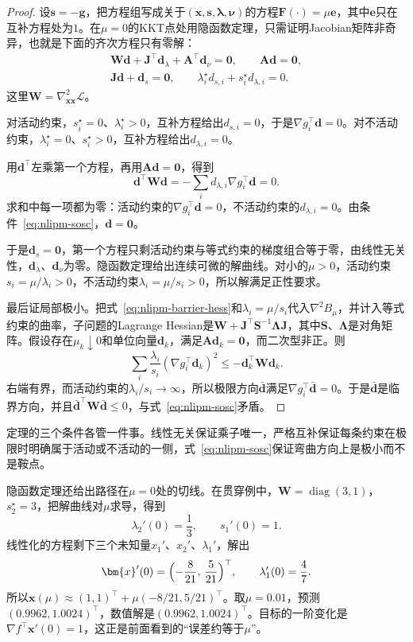 \begin{proof}
设$\bm{s}=-\bm{g}$，把方程组写成关于$(\bm{x},\bm{s},\bm{\lambda},\bm{\nu})$的方程$\bm{F}(\cdot)=\mu\bm{e}$，其中$\bm{e}$只在互补方程处为$1$。在$\mu=0$的KKT点处用隐函数定理，只需证明Jacobian矩阵非奇异，也就是下面的齐次方程只有零解：
\[
 \begin{gathered}
 \bm{W}\bm{d}+\bm{J}^\top\bm{d}_\lambda+\bm{A}^\top\bm{d}_\nu=\bm{0},\qquad\bm{A}\bm{d}=\bm{0},\\
 \bm{J}\bm{d}+\bm{d}_s=\bm{0},\qquad\lambda_i^\star d_{s,i}+s_i^\star d_{\lambda,i}=0.
 \end{gathered}
\]
这里$\bm{W}=\nabla^2_{\bm{x}\bm{x}}\mathcal{L}$。

对活动约束，$s_i^\star=0$、$\lambda_i^\star>0$，互补方程给出$d_{s,i}=0$，于是$\nabla g_i^\top\bm{d}=0$。对不活动约束，$\lambda_i^\star=0$、$s_i^\star>0$，互补方程给出$d_{\lambda,i}=0$。

用$\bm{d}^\top$左乘第一个方程，再用$\bm{A}\bm{d}=\bm{0}$，得到
\[
 \bm{d}^\top\bm{W}\bm{d}=-\sum_{i}d_{\lambda,i}\nabla g_i^\top\bm{d}=0.
\]
求和中每一项都为零：活动约束的$\nabla g_i^\top\bm{d}=0$，不活动约束的$d_{\lambda,i}=0$。由条件~\eqref{eq:nlipm-sosc}，$\bm{d}=\bm{0}$。

于是$\bm{d}_s=\bm{0}$，第一个方程只剩活动约束与等式约束的梯度组合等于零，由线性无关性，$\bm{d}_\lambda$、$\bm{d}_\nu$为零。隐函数定理给出连续可微的解曲线。对小的$\mu>0$，活动约束$s_i=\mu/\lambda_i>0$，不活动约束$\lambda_i=\mu/s_i>0$，所以解满足正性要求。

最后证局部极小。把式~\eqref{eq:nlipm-barrier-hess}和$\lambda_i=\mu/s_i$代入$\nabla^2B_\mu$，并计入等式约束的曲率，子问题的Lagrange Hessian是$\bm{W}+\bm{J}^\top\bm{S}^{-1}\bm{\Lambda}\bm{J}$，其中$\bm{S}$、$\bm{\Lambda}$是对角矩阵。假设存在$\mu_k\downarrow0$和单位向量$\bm{d}_k$，满足$\bm{A}\bm{d}_k=\bm{0}$，而二次型非正。则
\[
 \sum_{i}\frac{\lambda_i}{s_i}(\nabla g_i^\top\bm{d}_k)^2\leq-\bm{d}_k^\top\bm{W}\bm{d}_k.
\]
右端有界，而活动约束的$\lambda_i/s_i\to\infty$，所以极限方向$\bar{\bm{d}}$满足$\nabla g_i^\top\bar{\bm{d}}=0$。于是$\bar{\bm{d}}$是临界方向，并且$\bar{\bm{d}}^\top\bm{W}\bar{\bm{d}}\leq0$，与式~\eqref{eq:nlipm-sosc}矛盾。
\end{proof}

定理的三个条件各管一件事。线性无关保证乘子唯一，严格互补保证每条约束在极限时明确属于活动或不活动的一侧，式~\eqref{eq:nlipm-sosc}保证弯曲方向上是极小而不是鞍点。

隐函数定理还给出路径在$\mu=0$处的切线。在贯穿例中，$\bm{W}=\operatorname{diag}(3,1)$，$s_2^\star=3$，把解曲线对$\mu$求导，得到
\[
 \lambda_2'(0)=\frac13,\qquad s_1'(0)=1.
\]
线性化的方程剩下三个未知量$x_1'$、$x_2'$、$\lambda_1'$，解出
\[
 \bm{x}'(0)=\Bigl(-\frac{8}{21},\,\frac{5}{21}\Bigr)^\top,\qquad\lambda_1'(0)=\frac47.
\]
所以$\bm{x}(\mu)\approx(1,1)^\top+\mu(-8/21,5/21)^\top$。取$\mu=0.01$，预测$(0.9962,1.0024)^\top$，数值解是$(0.9962,1.0024)^\top$。目标的一阶变化是$\nabla f^\top\bm{x}'(0)=1$，这正是前面看到的“误差约等于$\mu$”。

